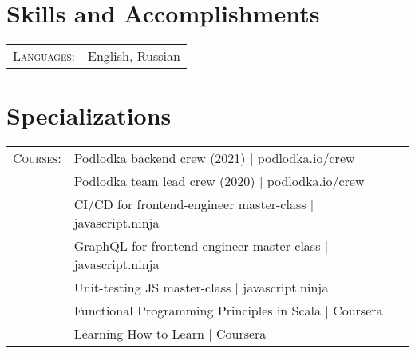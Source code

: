 \documentclass[a4paper,11pt]{article}
\begin{document}
\section{Skills and Accomplishments}
\begin{tabular}{rl}
  \textsc{Languages:}& English, Russian\\
\end{tabular}

\section{Specializations}
\begin{tabular}{rl}
  \textsc{Courses:}
  &Podlodka backend crew (2021) | podlodka.io/crew \\
  &Podlodka team lead crew (2020) | podlodka.io/crew \\
  &CI/CD for frontend-engineer master-class | javascript.ninja \\
  &GraphQL for frontend-engineer master-class | javascript.ninja \\
  &Unit-testing JS master-class | javascript.ninja \\
  &Functional Programming Principles in Scala | Coursera\\
  &Learning How to Learn | Coursera\\
\end{tabular}
\end{document}
